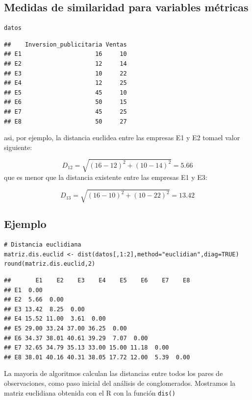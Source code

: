\documentclass[]{article}
\begin{document}
\subsection{Medidas de similaridad para variables
métricas}\label{medidas-de-similaridad-para-variables-muxe9tricas-1}

\hypertarget{left}{}
\begin{verbatim}
datos
\end{verbatim}

\begin{verbatim}
##    Inversion_publicitaria Ventas
## E1                     16     10
## E2                     12     14
## E3                     10     22
## E4                     12     25
## E5                     45     10
## E6                     50     15
## E7                     45     25
## E8                     50     27
\end{verbatim}

\hypertarget{right}{}
asi, por ejemplo, la distancia euclidea entre las empresas E1 y E2
tomael valor siguiente:

\[D_{12}=\sqrt{(16-12)^2+(10-14)^2}=5.66\] que es menor que la distancia
existente entre las empresas E1 y E3:

\[D_{13}=\sqrt{(16-10)^2+(10-22)^2}=13.42\]

\subsection{Ejemplo}\label{ejemplo-8}

\hypertarget{left}{}
\begin{verbatim}
# Distancia euclidiana
matriz.dis.euclid <- dist(datos[,1:2],method="euclidian",diag=TRUE)
round(matriz.dis.euclid,2)
\end{verbatim}

\begin{verbatim}
##       E1    E2    E3    E4    E5    E6    E7    E8
## E1  0.00                                          
## E2  5.66  0.00                                    
## E3 13.42  8.25  0.00                              
## E4 15.52 11.00  3.61  0.00                        
## E5 29.00 33.24 37.00 36.25  0.00                  
## E6 34.37 38.01 40.61 39.29  7.07  0.00            
## E7 32.65 34.79 35.13 33.00 15.00 11.18  0.00      
## E8 38.01 40.16 40.31 38.05 17.72 12.00  5.39  0.00
\end{verbatim}

\hypertarget{right}{}
La mayoria de algoritmos calculan las distancias entre todos los pares
de observaciones, como paso inicial del análisis de conglomerados.
Mostramos la matriz euclidiana obtenida con el R con la función
\texttt{dis()}
\end{document}
